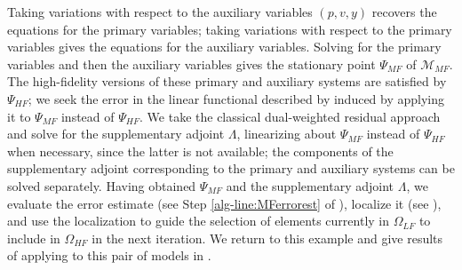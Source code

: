 Taking variations with respect to the auxiliary variables $(p,v,y)$ recovers the equations for the primary variables; taking variations with respect to the primary variables gives the equations for the auxiliary variables. Solving for the primary variables and then the auxiliary variables gives the stationary point $\Psi_{MF}$ of $\mathcal{M}_{MF}$. 
The high-fidelity versions of these primary and auxiliary systems are satisfied by $\Psi_{HF}$; we seek the error in the linear functional described by  induced by applying it to $\Psi_{MF}$ instead of $\Psi_{HF}$. We take the classical dual-weighted residual approach and solve for the supplementary adjoint $\Lambda$, linearizing about $\Psi_{MF}$ instead of $\Psi_{HF}$ when necessary, since the latter is not available; the components of the supplementary adjoint corresponding to the primary and auxiliary systems can be solved separately. Having obtained $\Psi_{MF}$ and the supplementary adjoint $\Lambda$, we evaluate the error estimate (see Step \ref{alg-line:MFerrorest} of ), localize it (see ), and use the localization to guide the selection of elements currently in $\Omega_{LF}$ to include in $\Omega_{HF}$ in the next iteration. We return to this example and give results of applying  to this pair of models in .

